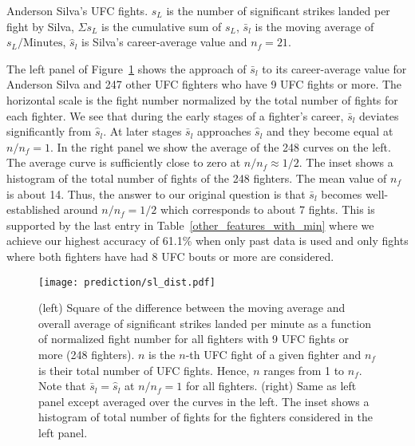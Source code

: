 \begin{center}
\begin{table}[h]

\caption{Anderson Silva's UFC fights. $s_L$ is the number
of significant strikes landed per fight by Silva, $\Sigma s_L$ is the cumulative
sum of $s_L$, $\bar{s}_l$ is the moving average of $s_L/\textrm{Minutes}$,
$\hat{s}_l$ is Silva's career-average value and $n_f=21$.}
\label{anderson_running_ave}
\end{table}
\end{center}

The left panel of Figure~\ref{normalized_sl_dist} shows the approach of
$\bar{s}_l$ to its career-average value for Anderson Silva and 247 other
UFC fighters who have 9 UFC fights or more. The horizontal
scale is the fight number normalized by the total number of fights for
each fighter. We see that during the early stages of a fighter's career, $\bar{s}_l$ deviates
significantly from $\hat{s}_l$. At later stages $\bar{s}_l$
approaches $\hat{s}_l$ and they become equal at $n/n_f=1$.
In the right panel we show the average of the 248 curves
on the left. The average curve is sufficiently close to zero at $n/n_f \approx 1/2$.
The inset shows a histogram of the total number of fights of the 248 fighters. The
mean value of $n_f$ is about 14.
Thus,
the answer to our original question is that $\bar{s}_l$ becomes
well-established around
$n/n_f=1/2$ which corresponds to about 7 fights. This is supported
by the last entry in Table~\ref{other_features_with_min} where we achieve our highest
accuracy of 61.1\% when only past data is used and 
only fights where both fighters have
had 8 UFC bouts or more are considered.

\begin{figure}[h]
\begin{center}
\texttt{[image: prediction/sl\_dist.pdf]}
\caption{(left) Square of the difference between the moving average
and overall average of significant strikes landed per minute as
a function of normalized fight number for all fighters with
9 UFC fights or more (248 fighters). $n$ is the $n$-th UFC fight of
a given fighter and $n_f$ is their total number of UFC fights. Hence,
$n$ ranges from 1 to $n_f$.
Note that $\bar{s}_l=\hat{s}_l$ at $n/n_f=1$ for all fighters.
(right) Same as left panel except averaged over the curves in the left.
The inset shows a histogram of total number of fights for the
fighters considered in the left panel.}
\label{normalized_sl_dist}
\end{center}
\end{figure}

